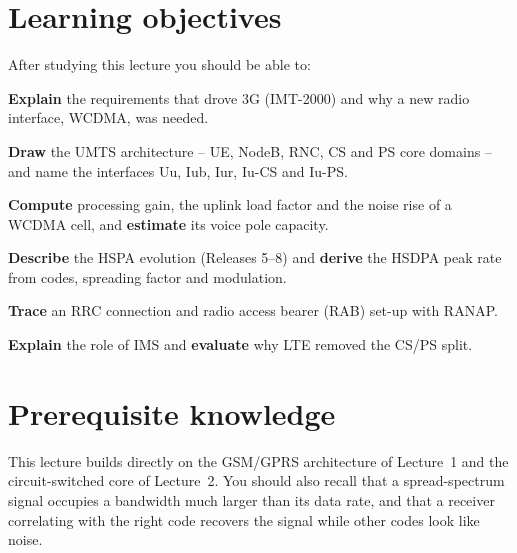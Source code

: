 \documentclass[11pt,a4paper]{article}
\begin{document}
\ACNcover

\section{Learning objectives}
After studying this lecture you should be able to:
\begin{objectives}
  \item \textbf{Explain} the requirements that drove 3G (IMT-2000) and why a new radio
        interface, WCDMA, was needed.
  \item \textbf{Draw} the UMTS architecture -- UE, NodeB, RNC, CS and PS core domains -- and
        name the interfaces Uu, Iub, Iur, Iu-CS and Iu-PS.
  \item \textbf{Compute} processing gain, the uplink load factor and the noise rise of a WCDMA
        cell, and \textbf{estimate} its voice pole capacity.
  \item \textbf{Describe} the HSPA evolution (Releases 5--8) and \textbf{derive} the HSDPA peak rate
        from codes, spreading factor and modulation.
  \item \textbf{Trace} an RRC connection and radio access bearer (RAB) set-up with RANAP.
  \item \textbf{Explain} the role of IMS and \textbf{evaluate} why LTE removed the CS/PS split.
\end{objectives}

\section{Prerequisite knowledge}
This lecture builds directly on the GSM/GPRS architecture of Lecture~1 and the
circuit-switched core of Lecture~2. You should also recall that a spread-spectrum signal
occupies a bandwidth much larger than its data rate, and that a receiver correlating
with the right code recovers the signal while other codes look like noise.
\end{document}
